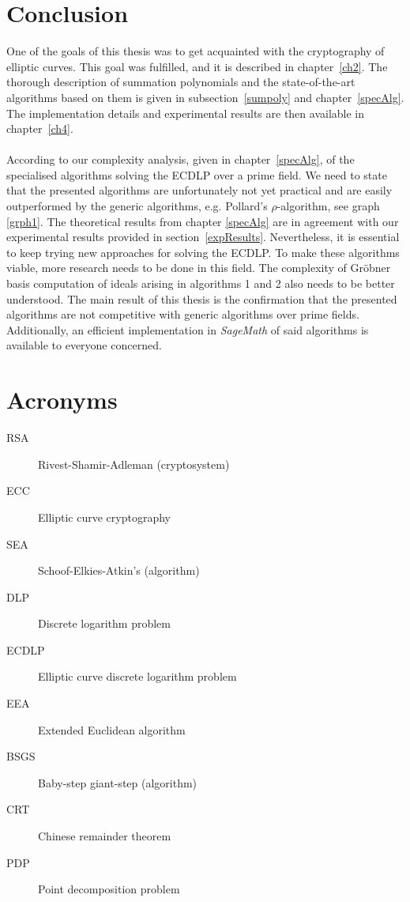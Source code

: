 \documentclass[thesis=M,english]{FITthesis}[2012/10/20]
\theoremstyle{remark}
\theoremstyle{definition}
\begin{document}
\chapter{Conclusion}
One of the goals of this thesis was to get acquainted with the cryptography of elliptic curves. This goal was fulfilled, and it is described in chapter~\ref{ch2}. The thorough description of summation polynomials and the state-of-the-art algorithms based on them is given in subsection~\ref{sumpoly} and chapter~\ref{specAlg}. The implementation details and experimental results are then available in chapter~\ref{ch4}. \\
\\
\noindent According to our complexity analysis, given in chapter~\ref{specAlg}, of the specialised algorithms solving the ECDLP over a prime field. We need to state that the presented algorithms are unfortunately not yet practical and are easily outperformed by the generic algorithms, e.g. Pollard's $\rho$-algorithm, see graph \ref{grph1}. The theoretical results from chapter \ref{specAlg} are in agreement with our experimental results provided in section~\ref{expResults}. Nevertheless, it is essential to keep trying new approaches for solving the ECDLP. To make these algorithms viable, more research needs to be done in this field. The complexity of Gröbner basis computation of ideals arising in algorithms 1 and 2 also needs to be better understood. The main result of this thesis is the confirmation that the presented algorithms are not competitive with generic algorithms over prime fields. Additionally, an efficient implementation in \textit{SageMath} of said algorithms is available to everyone concerned.
%
%


\appendix

\chapter{Acronyms}
\begin{description}
	\item[RSA] Rivest-Shamir-Adleman (cryptosystem)
	\item[ECC] Elliptic curve cryptography
	\item[SEA] Schoof-Elkies-Atkin’s (algorithm)
	\item[DLP] Discrete logarithm problem
	\item[ECDLP] Elliptic curve discrete logarithm problem
	\item[EEA] Extended Euclidean algorithm
	\item[BSGS] Baby-step giant-step (algorithm)
	\item[CRT] Chinese remainder theorem
	\item[PDP] Point decomposition problem
\end{description}
\end{document}
